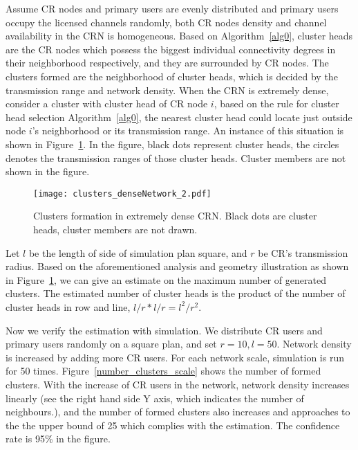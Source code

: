 Assume CR nodes and primary users are evenly distributed and primary users occupy the licensed channels randomly, \ie both CR nodes density and channel availability in the CRN is homogeneous.
Based on Algorithm~\ref{alg0}, cluster heads are the CR nodes which possess the biggest individual connectivity degrees in their neighborhood respectively, and they are surrounded by CR nodes.
The clusters formed are the neighborhood of cluster heads, which is decided by the transmission range and network density.
When the CRN is extremely dense, consider a cluster with cluster head of CR node $i$, based on the rule for cluster head selection Algorithm~\ref{alg0}, the nearest cluster head could locate just outside node $i$'s neighborhood or its transmission range.
An instance of this situation is shown in Figure~\ref{clusters_denseNetwork}.
%
In the figure, black dots represent cluster heads, the circles denotes the transmission ranges of those cluster heads.
Cluster members are not shown in the figure.
\begin{figure}[h!]
  \centering
  \texttt{[image: clusters\_denseNetwork\_2.pdf]}
  \caption{Clusters formation in extremely dense CRN. Black dots are cluster heads, cluster members are not drawn.}
  \label{clusters_denseNetwork}
\end{figure}
Let $l$ be the length of side of simulation plan square, and $r$ be CR's transmission radius.
Based on the aforementioned analysis and geometry illustration as shown in Figure~\ref{clusters_denseNetwork}, we can give an estimate on the maximum number of generated clusters.
The estimated number of cluster heads is the product of the number of cluster heads in row and line, $l/r * l/r = l^2/r^2$.

Now we verify the estimation with simulation.
We distribute CR users and primary users randomly on a square plan, and set $r=10, l=50$.
Network density is increased by adding more CR users.
For each network scale, simulation is run for 50 times.
Figure~\ref{number_clusters_scale} shows the number of formed clusters.
With the increase of CR users in the network, network density increases linearly (see the right hand side Y axis, which indicates the number of neighbours.), and the number of formed clusters also increases and approaches to the the upper bound of 25 which complies with the estimation.
The confidence rate is 95\% in the figure.


